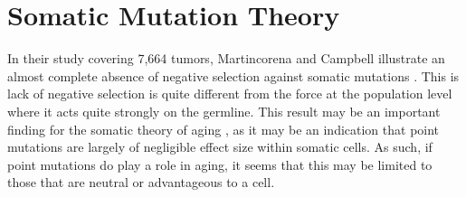 \documentclass[]{book}
\begin{document}
\hypertarget{somatic-mutation-theory}{%
\section{Somatic Mutation Theory}\label{somatic-mutation-theory}}

In their study covering 7,664 tumors, Martincorena and Campbell illustrate an almost complete absence of negative selection against somatic mutations \citep{martincorena2017universal}. This is lack of negative selection is quite different from the force at the population level where it acts quite strongly on the germline. This result may be an important finding for the somatic theory of aging \citep{morley1995somatic}, as it may be an indication that point mutations are largely of negligible effect size
within somatic cells. As such, if point mutations do play a role in aging, it seems that this may be limited to those that are neutral or advantageous to a cell.


\end{document}
